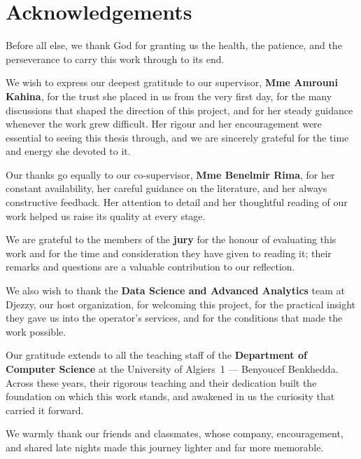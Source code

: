 \documentclass[12pt, a4paper]{report}
\begin{document}

\chapter*{Acknowledgements}

Before all else, we thank God for granting us the health, the patience, and the perseverance to carry this work through to its end.

We wish to express our deepest gratitude to our supervisor, \textbf{Mme Amrouni Kahina}, for the trust she placed in us from the very first day, for the many discussions that shaped the direction of this project, and for her steady guidance whenever the work grew difficult. Her rigour and her encouragement were essential to seeing this thesis through, and we are sincerely grateful for the time and energy she devoted to it.

Our thanks go equally to our co-supervisor, \textbf{Mme Benelmir Rima}, for her constant availability, her careful guidance on the literature, and her always constructive feedback. Her attention to detail and her thoughtful reading of our work helped us raise its quality at every stage.

We are grateful to the members of the \textbf{jury} for the honour of evaluating this work and for the time and consideration they have given to reading it; their remarks and questions are a valuable contribution to our reflection.

We also wish to thank the \textbf{Data Science and Advanced Analytics} team at Djezzy, our host organization, for welcoming this project, for the practical insight they gave us into the operator's services, and for the conditions that made the work possible.

Our gratitude extends to all the teaching staff of the \textbf{Department of Computer Science} at the University of Algiers~1 --- Benyoucef Benkhedda. Across these years, their rigorous teaching and their dedication built the foundation on which this work stands, and awakened in us the curiosity that carried it forward.

We warmly thank our friends and classmates, whose company, encouragement, and shared late nights made this journey lighter and far more memorable.
\end{document}
